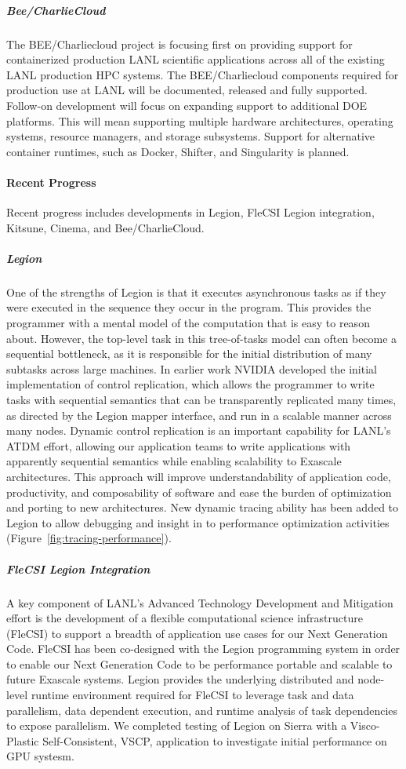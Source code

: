 \subparagraph{Bee/CharlieCloud}
The BEE/Charliecloud project is focusing first on providing support for
containerized production LANL scientific applications across all of the
existing LANL production HPC systems.  The BEE/Charliecloud components required
for production use at LANL will be documented, released and fully supported.
Follow-on development will focus on expanding support to additional DOE
platforms.  This will mean supporting multiple hardware architectures,
operating systems, resource managers, and storage subsystems.  Support for
alternative container runtimes, such as Docker, Shifter, and Singularity is
planned.

\paragraph{Recent Progress} %
Recent progress includes developments in Legion, FleCSI Legion integration, Kitsune, Cinema, and Bee/CharlieCloud.

\subparagraph{Legion} 
One of the strengths of Legion is that it executes asynchronous tasks as if they were executed in the sequence they occur in the program. This provides the programmer with a mental model of the computation that is easy to reason about. However, the top-level task in this tree-of-tasks model can often become a sequential bottleneck, as it is responsible for the initial distribution of many subtasks across large machines. In earlier work NVIDIA developed the initial implementation of control replication, which allows the programmer to write tasks with sequential semantics that can be  transparently replicated many times, as directed by the Legion mapper interface, and run in a scalable manner across many nodes.
Dynamic control replication is an important capability for LANL's ATDM effort, allowing our application teams to write applications with apparently sequential semantics while enabling scalability to Exascale architectures. This approach will improve understandability of application code, productivity, and composability of software and ease the burden of optimization and porting to new architectures. 
New dynamic tracing ability has been added to Legion to allow debugging and insight in to performance optimization activities (Figure~\ref{fig:tracing-performance}).

\subparagraph{FleCSI Legion Integration} 
A key component of LANL's Advanced Technology  Development and Mitigation effort is the development of a flexible computational science infrastructure (FleCSI) to support a breadth of application use cases for our Next Generation Code. FleCSI has been co-designed with the Legion programming system in order to enable our Next Generation Code to be performance portable and scalable to future Exascale systems. Legion provides the underlying distributed and node-level runtime environment required for FleCSI to leverage task and data parallelism, data dependent execution, and runtime analysis of task dependencies to expose parallelism. We completed testing of Legion on Sierra with a Visco-Plastic Self-Consistent, VSCP, application to investigate initial performance on GPU systesm.

